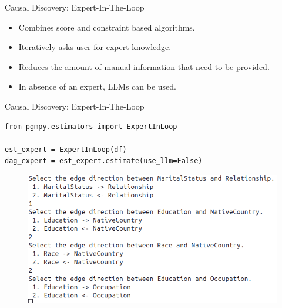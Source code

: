 \documentclass[aspectratio=169]{beamer}
\begin{document}
\begin{frame}{Causal Discovery: Expert-In-The-Loop}

	\vspace{2em}

	\begin{itemize}
		\item Combines score and constraint based algorithms.
		\item Iteratively asks user for expert knowledge.
		\item Reduces the amount of manual information that need to be provided.
		\item In absence of an expert, LLMs can be used.
	\end{itemize}
\end{frame}

\begin{frame}[fragile]{Causal Discovery: Expert-In-The-Loop}
	\begin{verbatim}
from pgmpy.estimators import ExpertInLoop

est_expert = ExpertInLoop(df)
dag_expert = est_expert.estimate(use_llm=False)
	\end{verbatim}
	\begin{figure}
		\includegraphics[scale=0.4, left]{imgs/expert_prompt.png}
	\end{figure}
\end{frame}
\end{document}
